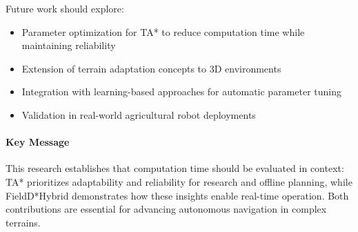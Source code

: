 Future work should explore:
\begin{itemize}
    \item Parameter optimization for TA* to reduce computation time while maintaining reliability
    \item Extension of terrain adaptation concepts to 3D environments
    \item Integration with learning-based approaches for automatic parameter tuning
    \item Validation in real-world agricultural robot deployments
\end{itemize}

\paragraph{Key Message}
This research establishes that computation time should be evaluated in context: TA* prioritizes adaptability and reliability for research and offline planning, while FieldD*Hybrid demonstrates how these insights enable real-time operation. Both contributions are essential for advancing autonomous navigation in complex terrains.
